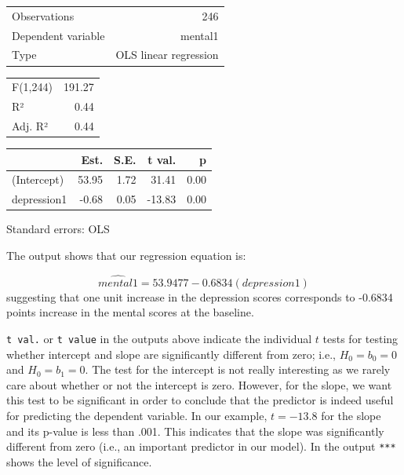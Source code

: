 \documentclass[]{book}
\begin{document}
\begin{table}[!h]
\centering
\begin{tabular}{lr}
\toprule
\rowcolor{gray!6}  Observations & 246\\
Dependent variable & mental1\\
\rowcolor{gray!6}  Type & OLS linear regression\\
\bottomrule
\end{tabular}
\end{table} \begin{table}[!h]
\centering
\begin{tabular}{lr}
\toprule
\rowcolor{gray!6}  F(1,244) & 191.27\\
R² & 0.44\\
\rowcolor{gray!6}  Adj. R² & 0.44\\
\bottomrule
\end{tabular}
\end{table} \begin{table}[!h]
\centering
\begin{threeparttable}
\begin{tabular}{lrrrr}
\toprule
  & Est. & S.E. & t val. & p\\
\midrule
\rowcolor{gray!6}  (Intercept) & 53.95 & 1.72 & 31.41 & 0.00\\
depression1 & -0.68 & 0.05 & -13.83 & 0.00\\
\bottomrule
\end{tabular}
\begin{tablenotes}
\item Standard errors: OLS
\end{tablenotes}
\end{threeparttable}
\end{table}

The output shows that our regression equation is:

\[\hat{mental1} = 53.9477 - 0.6834(depression1)\]
suggesting that one unit increase in the depression scores corresponds to -0.6834 points increase in the mental scores at the baseline.

\texttt{t\ val.} or \texttt{t\ value} in the outputs above indicate the individual \(t\) tests for testing whether intercept and slope are significantly different from zero; i.e., \(H_0 = b_0 = 0\) and \(H_0 = b_1 = 0\). The test for the intercept is not really interesting as we rarely care about whether or not the intercept is zero. However, for the slope, we want this test to be significant in order to conclude that the predictor is indeed useful for predicting the dependent variable. In our example, \(t = -13.8\) for the slope and its p-value is less than .001. This indicates that the slope was significantly different from zero (i.e., an important predictor in our model). In the output \texttt{***} shows the level of significance.
\end{document}
